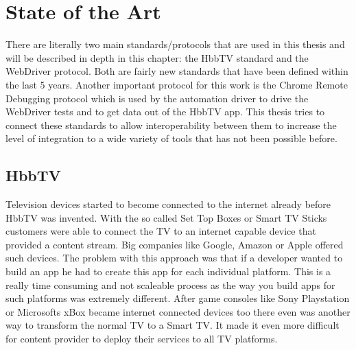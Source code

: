 %
%

\chapter{State of the Art\label{cha:state_of_the_art}}

There are literally two main standards/protocols that are used in this thesis and will be described in
depth in this chapter: the HbbTV standard and the WebDriver protocol. Both are fairly new standards that
have been defined within the last 5 years. Another important protocol for this work is the Chrome Remote
Debugging protocol which is used by the automation driver to drive the WebDriver tests and to get data out of
the HbbTV app. This thesis tries to connect these standards to allow interoperability between them to
increase the level of integration to a wide variety of tools that has not been possible before.

\section{HbbTV\label{sec:hbbtv}}


Television devices started to become connected to the internet already before HbbTV was invented. With
the so called Set Top Boxes or Smart TV Sticks customers were able to connect the TV to an internet
capable device that provided a content stream. Big companies like Google, Amazon or Apple offered such
devices. The problem with this approach was that if a developer wanted to build an app he had to create
this app for each individual platform. This is a really time consuming and not scaleable process as
the way you build apps for such platforms was extremely different. After game consoles like Sony Playstation
or Microsofts xBox became internet connected devices too there even was another way to transform
the normal TV to a Smart TV. It made it even more difficult for content provider to deploy their services
to all TV platforms.

